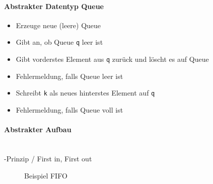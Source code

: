 \documentclass[
    ngerman,
    color=3b,
    load_common, %
    summary,
    boxarc,
]{tuda_summary}
\begin{document}
\paragraph{Abstrakter Datentyp Queue}
\begin{description}[leftmargin=3cm,itemsep=1em]
    \item [\texttt{new Q()}]
          \begin{itemize}
              \item Erzeuge neue (leere) Queue
          \end{itemize}

    \item [\texttt{q.isEmpty()}]
          \begin{itemize}
              \item Gibt an, ob Queue \texttt{q} leer ist
          \end{itemize}

    \item [\texttt{q.dequeue()}]
          \begin{itemize}
              \item Gibt vorderstes Element aus \texttt{q} zurück und löscht es auf Queue
              \item Fehlermeldung, falls Queue leer ist
          \end{itemize}

    \item [\texttt{q.enqueue(k)}]
          \begin{itemize}
              \item Schreibt \texttt{k} als neues hinterstes Element auf \texttt{q}
              \item Fehlermeldung, falls Queue voll ist
          \end{itemize}

\end{description}

\paragraph{Abstrakter Aufbau}\mbox{}\\
-Prinzip / First in, First out
\begin{figure}[h]
    \centering
    
    \caption{Beispiel FIFO}
\end{figure}
\clearpage
\end{document}
